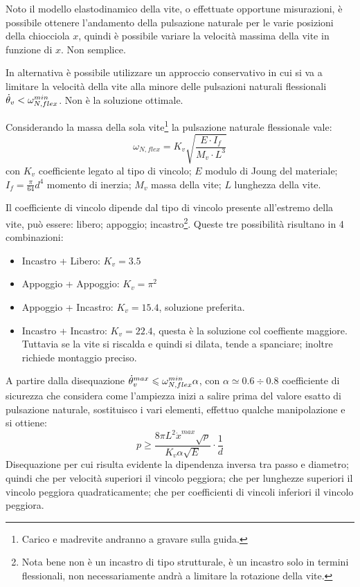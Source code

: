 Noto il modello elastodinamico della vite, o effettuate opportune misurazioni, è possibile ottenere l'andamento della pulsazione naturale per le varie posizioni della chiocciola \(x\), quindi è possibile variare la  velocità massima della vite in funzione di \(x\). Non semplice.

In alternativa è possibile utilizzare un approccio conservativo in cui si va a limitare la velocità della vite alla minore delle pulsazioni naturali flessionali \( \dot{\theta}_v < \omega_{N,flex}^{min} \). Non è la soluzione ottimale.

Considerando la massa della sola vite\footnote{Carico e madrevite andranno a gravare sulla guida.} la pulsazione naturale flessionale vale:
\[ \omega_{N,flex} = K_v \sqrt{\frac{E \cdot I_f}{M_v \cdot L^3}} \]
con \( K_v \) coefficiente legato al tipo di vincolo; \( E \) modulo di Joung del materiale; \( I_f = \frac{\pi}{64}d^4 \) momento di inerzia; \( M_v \) massa della vite; \( L \) lunghezza della vite.

Il coefficiente di vincolo dipende dal tipo di vincolo presente all'estremo della vite, può essere: libero; appoggio; incastro\footnote{Nota bene non è un incastro di tipo strutturale, è un incastro solo in termini flessionali, non necessariamente andrà a limitare la rotazione della vite.}.
Queste tre possibilità risultano in 4 combinazioni:
\begin{itemize}
    \item Incastro + Libero: \(K_v = 3.5\)
    \item Appoggio + Appoggio: \(K_v = \pi^2\)
    \item Appoggio + Incastro: \(K_v = 15.4\), soluzione preferita.
    \item Incastro + Incastro: \(K_v = 22.4\), questa è la soluzione col coeffiente maggiore. Tuttavia se la vite si riscalda e quindi si dilata, tende a spanciare; inoltre richiede montaggio preciso.
\end{itemize}

A partire dalla disequazione \( \dot{\theta}_v^{max} \leqslant \omega_{N,flex}^{min} \alpha \), con \( \alpha \simeq 0.6\div 0.8 \) coefficiente di sicurezza che considera come l'ampiezza inizi a salire prima del valore esatto di pulsazione naturale, sostituisco i vari elementi, effettuo qualche manipolazione e si ottiene:
\[ p \geqslant \frac{8\pi L^2 \dot{x}^{max} \sqrt{\rho}}{K_v \alpha \sqrt{E}} \cdot \frac{1}{d} \]
Disequazione per cui risulta evidente la dipendenza inversa tra passo e diametro; quindi che per velocità superiori il vincolo peggiora; che per lunghezze superiori il vincolo peggiora quadraticamente; che per coefficienti di vincoli inferiori il vincolo peggiora.

